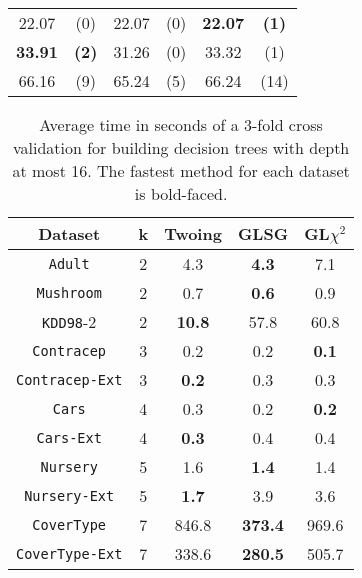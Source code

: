 \begin{table*}
\begin{subtable}{.4\linewidth}
\begin{tabular}{cc|cc|cc}
 22.07      &  (0)             &  22.07       & (0)             & {\bf 22.07} &  {\bf (1)}          \\
 {\bf 33.91}&  {\bf (2)}       & 31.26        &  (0)            &  33.32      &  (1)                 \\  \hline
 66.16      &  (9)             & 65.24        & (5)             &  66.24      & (14)
       \end{tabular}
    \end{subtable} 
\end{table*}


\begin{table}[]
\small
\caption{Average time in seconds of a 3-fold cross validation
for building decision trees with depth at most 16.
The fastest method for each dataset is bold-faced.}
\centering
\begin{tabular}{c|c|c|c|c}
Dataset             & k  & Twoing        & GLSG      & GL$\chi^2$   \\ \hline
{\tt Adult}         & 2  & 4.3           & {\bf 4.3} & 7.1          \\
{\tt Mushroom}      & 2  & 0.7           & {\bf 0.6} & 0.9          \\
{\tt KDD98}-2       & 2  & {\bf 10.8}    & 57.8      & 60.8         \\
{\tt Contracep}     & 3  & 0.2           & 0.2       & {\bf 0.1}    \\
{\tt Contracep-Ext} & 3  & {\bf 0.2}     & 0.3       & 0.3          \\
{\tt Cars}          & 4  & 0.3           & 0.2       & {\bf 0.2}    \\
{\tt Cars-Ext}      & 4  & {\bf 0.3}     & 0.4       & 0.4          \\
{\tt Nursery}       & 5  & 1.6           &  {\bf 1.4}      &  1.4        \\
{\tt Nursery-Ext}   & 5  & {\bf 1.7}           &  3.9 & 3.6          \\
{\tt CoverType}     & 7  & 846.8         &{\bf 373.4}& 969.6        \\
{\tt CoverType-Ext} & 7  & 338.6         &{\bf 280.5}& 505.7        \\

\end{tabular}
\end{table}
